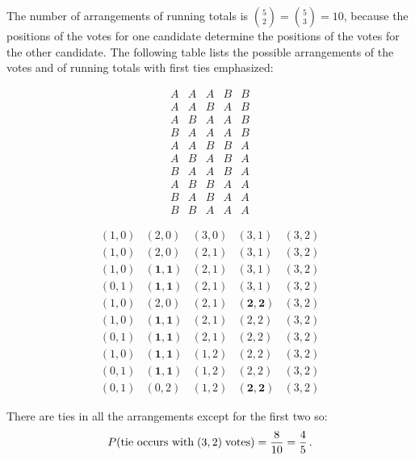The number of arrangements of running totals is ${5\choose 2}={5\choose 3}=10$, because the positions of the votes for one candidate determine the positions of the votes for the other candidate. The following table lists the possible arrangements of the votes and of running totals with first ties emphasized:
\begin{center}
\begin{minipage}{.48\textwidth}
\[
\begin{array}{ccccc}
A & A & A & B & B\\
A & A & B & A & B\\
A & B & A & A & B\\
B & A & A & A & B\\%
A & A & B & B & A\\
A & B & A & B & A\\
B & A & A & B & A\\%
A & B & B & A & A\\
B & A & B & A & A\\%
B & B & A & A & A
\end{array}
\]
\end{minipage}
\hspace{-4em}
\begin{minipage}{.48\textwidth}
\[
\begin{array}{rrrrr}
(1,0) & (2,0) & (3,0) & (3,1) & (3,2)\\
(1,0) & (2,0) & (2,1) & (3,1) & (3,2)\\
(1,0) & \mathbf{(1,1)} & (2,1) & (3,1) & (3,2)\\
(0,1) & \mathbf{(1,1)} & (2,1) & (3,1) & (3,2)\\%
(1,0) & (2,0) & (2,1) & \mathbf{(2,2)} & (3,2)\\
(1,0) & \mathbf{(1,1)} & (2,1) & (2,2) & (3,2)\\
(0,1) & \mathbf{(1,1)} & (2,1) & (2,2) & (3,2)\\%
(1,0) & \mathbf{(1,1)} & (1,2) & (2,2) & (3,2)\\
(0,1) & \mathbf{(1,1)} & (1,2) & (2,2) & (3,2)\\%
(0,1) & (0,2) & (1,2) &  \mathbf{(2,2)} & (3,2)
\end{array}
\]
\end{minipage}
\end{center}
There are ties in all the arrangements except for the first two so:
\[
P(\textrm{tie occurs with}\;(3,2)\;\textrm{votes})=\displaystyle\frac{8}{10}=\displaystyle\frac{4}{5}\,.
\]

